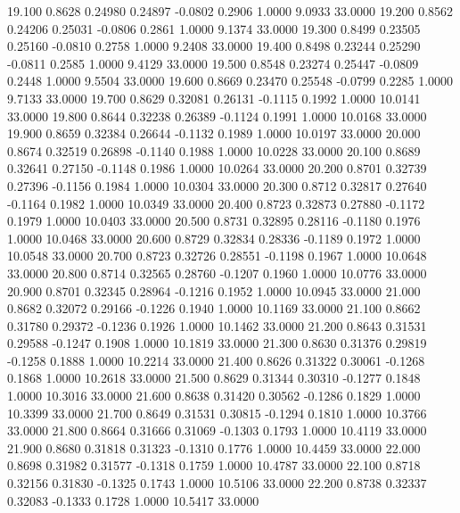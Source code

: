  19.100   0.8628   0.24980   0.24897  -0.0802   0.2906   1.0000   9.0933  33.0000
  19.200   0.8562   0.24206   0.25031  -0.0806   0.2861   1.0000   9.1374  33.0000
  19.300   0.8499   0.23505   0.25160  -0.0810   0.2758   1.0000   9.2408  33.0000
  19.400   0.8498   0.23244   0.25290  -0.0811   0.2585   1.0000   9.4129  33.0000
  19.500   0.8548   0.23274   0.25447  -0.0809   0.2448   1.0000   9.5504  33.0000
  19.600   0.8669   0.23470   0.25548  -0.0799   0.2285   1.0000   9.7133  33.0000
  19.700   0.8629   0.32081   0.26131  -0.1115   0.1992   1.0000  10.0141  33.0000
  19.800   0.8644   0.32238   0.26389  -0.1124   0.1991   1.0000  10.0168  33.0000
  19.900   0.8659   0.32384   0.26644  -0.1132   0.1989   1.0000  10.0197  33.0000
  20.000   0.8674   0.32519   0.26898  -0.1140   0.1988   1.0000  10.0228  33.0000
  20.100   0.8689   0.32641   0.27150  -0.1148   0.1986   1.0000  10.0264  33.0000
  20.200   0.8701   0.32739   0.27396  -0.1156   0.1984   1.0000  10.0304  33.0000
  20.300   0.8712   0.32817   0.27640  -0.1164   0.1982   1.0000  10.0349  33.0000
  20.400   0.8723   0.32873   0.27880  -0.1172   0.1979   1.0000  10.0403  33.0000
  20.500   0.8731   0.32895   0.28116  -0.1180   0.1976   1.0000  10.0468  33.0000
  20.600   0.8729   0.32834   0.28336  -0.1189   0.1972   1.0000  10.0548  33.0000
  20.700   0.8723   0.32726   0.28551  -0.1198   0.1967   1.0000  10.0648  33.0000
  20.800   0.8714   0.32565   0.28760  -0.1207   0.1960   1.0000  10.0776  33.0000
  20.900   0.8701   0.32345   0.28964  -0.1216   0.1952   1.0000  10.0945  33.0000
  21.000   0.8682   0.32072   0.29166  -0.1226   0.1940   1.0000  10.1169  33.0000
  21.100   0.8662   0.31780   0.29372  -0.1236   0.1926   1.0000  10.1462  33.0000
  21.200   0.8643   0.31531   0.29588  -0.1247   0.1908   1.0000  10.1819  33.0000
  21.300   0.8630   0.31376   0.29819  -0.1258   0.1888   1.0000  10.2214  33.0000
  21.400   0.8626   0.31322   0.30061  -0.1268   0.1868   1.0000  10.2618  33.0000
  21.500   0.8629   0.31344   0.30310  -0.1277   0.1848   1.0000  10.3016  33.0000
  21.600   0.8638   0.31420   0.30562  -0.1286   0.1829   1.0000  10.3399  33.0000
  21.700   0.8649   0.31531   0.30815  -0.1294   0.1810   1.0000  10.3766  33.0000
  21.800   0.8664   0.31666   0.31069  -0.1303   0.1793   1.0000  10.4119  33.0000
  21.900   0.8680   0.31818   0.31323  -0.1310   0.1776   1.0000  10.4459  33.0000
  22.000   0.8698   0.31982   0.31577  -0.1318   0.1759   1.0000  10.4787  33.0000
  22.100   0.8718   0.32156   0.31830  -0.1325   0.1743   1.0000  10.5106  33.0000
  22.200   0.8738   0.32337   0.32083  -0.1333   0.1728   1.0000  10.5417  33.0000
